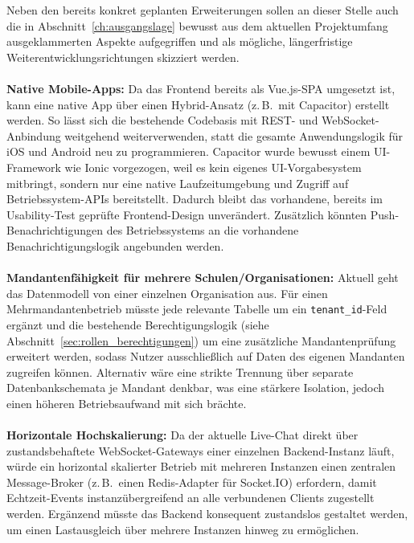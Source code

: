 \label{sec:ausblick_nichtziele}
Neben den bereits konkret geplanten Erweiterungen sollen an dieser Stelle auch die in Abschnitt~\ref{ch:ausgangslage} bewusst aus dem aktuellen Projektumfang ausgeklammerten Aspekte aufgegriffen und als mögliche, längerfristige Weiterentwicklungsrichtungen skizziert werden.
\paragraph{}
\textbf{Native Mobile-Apps:} Da das Frontend bereits als Vue.js-\gls{SPA} umgesetzt ist, kann eine native App über einen Hybrid-Ansatz (z.\,B.\ mit Capacitor) erstellt werden. So lässt sich die bestehende Codebasis mit REST- und WebSocket-Anbindung weitgehend weiterverwenden, statt die gesamte Anwendungslogik für iOS und Android neu zu programmieren. Capacitor wurde bewusst einem UI-Framework wie Ionic vorgezogen, weil es kein eigenes UI-Vorgabesystem mitbringt, sondern nur eine native Laufzeitumgebung und Zugriff auf Betriebssystem-APIs bereitstellt. Dadurch bleibt das vorhandene, bereits im Usability-Test geprüfte Frontend-Design unverändert. Zusätzlich könnten Push-Benachrichtigungen des Betriebssystems an die vorhandene Benachrichtigungslogik angebunden werden.
\paragraph{}
\textbf{Mandantenfähigkeit für mehrere Schulen/Organisationen:} Aktuell geht das Datenmodell von einer einzelnen Organisation aus. Für einen Mehrmandantenbetrieb müsste jede relevante Tabelle um ein \texttt{tenant\_id}-Feld ergänzt und die bestehende Berechtigungslogik (siehe Abschnitt~\ref{sec:rollen_berechtigungen}) um eine zusätzliche Mandantenprüfung erweitert werden, sodass Nutzer ausschließlich auf Daten des eigenen Mandanten zugreifen können. Alternativ wäre eine strikte Trennung über separate Datenbankschemata je Mandant denkbar, was eine stärkere Isolation, jedoch einen höheren Betriebsaufwand mit sich brächte.
\paragraph{}
\textbf{Horizontale Hochskalierung:} Da der aktuelle Live-Chat direkt über zustandsbehaftete WebSocket-Gateways einer einzelnen Backend-Instanz läuft, würde ein horizontal skalierter Betrieb mit mehreren Instanzen einen zentralen Message-Broker (z.\,B.\ einen Redis-Adapter für Socket.IO) erfordern, damit Echtzeit-Events instanzübergreifend an alle verbundenen Clients zugestellt werden. Ergänzend müsste das Backend konsequent zustandslos gestaltet werden, um einen Lastausgleich über mehrere Instanzen hinweg zu ermöglichen.
